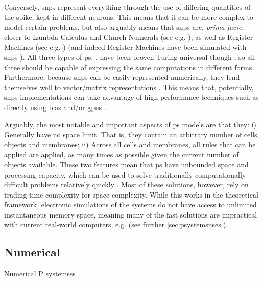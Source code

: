 Conversely, \gls{snps} represent everything through the use of differing quantities of the spike, kept in different neurons.  This means that it can be more complex to model certain problems, but also arguably means that \gls{snps} are, \textit{prima facie}, closer to Lambda Calculus \cite{Barendregt1984} and Church Numerals (see e.g. \cite{Koopman2014,Hinze2005}), as well as Register Machines (see e.g. \cite{Korec1996}) (and indeed Register Machines have been simulated with \gls{snps} \cite{Pan2010}).  All three types of \gls{ps}, , have been proven Turing-universal though \cite{Bernardini2005,Chen2008,Freund2005}, so all three should be capable of expressing the same computations in different forms.  Furthermore, because \gls{snps} can be easily represented numerically, they lend themselves well to vector/matrix representations \cite{Zeng2010,Martinez-del-Amor2021,Gheorghe2021,Hu2016}.  This means that, potentially, \gls{snps} implementations can take advantage of high-performance techniques such as directly using \gls{blas} and/or \glspl{gpu} \cite{Aboy2019}.

Arguably, the most notable and important aspects of \gls{ps} models are that they:  i) Generally have no space limit.  That is, they contain an arbitrary number of cells, objects and membranes;  ii) Across all cells and membranes, all rules that can be applied are applied, as many times as possible given the current number of objects available.  These two features mean that \gls{ps} have unbounded space and processing capacity, which can be used to solve traditionally computationally-difficult problems relatively quickly \cite{Sosik2003,Jimenez2003,Paun1999a,Henderson2020}.  Most of these solutions, however, rely on trading time complexity for space complexity.  While this works in the theoretical framework, electronic simulations of the systems do not have access to unlimited instantaneous memory space, meaning many of the fast solutions are impractical with current real-world computers, e.g. \cite{Cooper2019,Cooper2019a} \fxnote[inline]{[refs]} (see further \autoref{sec:psystemsuses}).

\subsection{\label{subsec:numpsys}Numerical }
Numerical P systemsss

